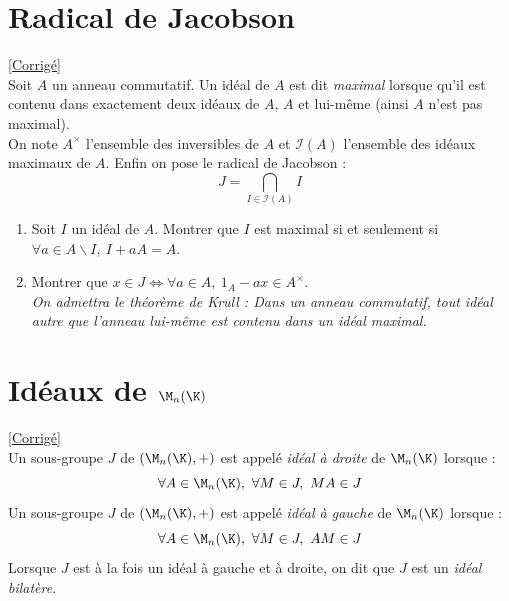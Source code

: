 \documentclass[8pt]{book}
\begin{document}
	\section{Radical de Jacobson }
	\label{Radical de Jacobson}
	\textcolor{blue}{\hyperref[Radical de Jacobson corrigé]{[Corrigé]}}\\
	Soit $A$ un anneau commutatif. Un idéal de $A$ est dit \textit{maximal} lorsque qu'il est contenu dans exactement deux idéaux de $A$, $A$ et lui-même (ainsi $A$ n'est pas maximal).\\
	On note $A^\times$ l'ensemble des inversibles de $A$ et $\mathcal I(A)$ l'ensemble des idéaux maximaux de $A$. Enfin on pose le radical de Jacobson : $$J=\bigcap\limits_{I\in \mathcal I(A)}I$$
	\begin{enumerate}
		\item Soit $I$ un idéal de $A$. Montrer que $I$ est maximal si et seulement si $\forall a\in A\backslash I,\ I+aA=A$.
		\item Montrer que $x\in J\iff \forall a\in A,\ 1_A-ax\in A^\times$.\\
		\textit{On admettra le théorème de Krull : Dans un anneau commutatif, tout idéal autre que l'anneau lui-même est contenu dans un idéal maximal.}
	\end{enumerate}
	
	\section{Idéaux de $\M_n(\K)$}
	\label{Idéaux de Mn(K)}
	\textcolor{blue}{\hyperref[Idéaux de Mn(K) corrigé]{[Corrigé]}}\\
	Un sous-groupe $J$ de $(\M_n(\K),+)$ est appelé \textit{idéal à droite} de $\M_n(\K)$ lorsque :
	$$\forall A\in \M_n(\K),\ \forall M\in J,\ MA\in J$$
	Un sous-groupe $J$ de $(\M_n(\K),+)$ est appelé \textit{idéal à gauche} de $\M_n(\K)$ lorsque :
	$$\forall A\in \M_n(\K),\ \forall M\in J,\ AM\in J$$
	Lorsque $J$ est à la fois un idéal à gauche et à droite, on dit que $J$ est un \textit{idéal bilatère}.
	
\end{document}
